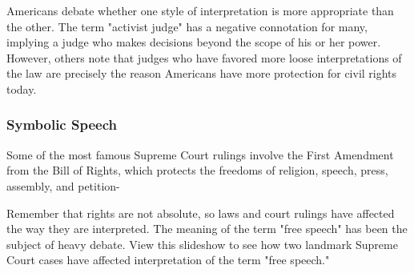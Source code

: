 Americans debate whether one style of interpretation is more appropriate than
the other. The term "activist judge" has a negative connotation for many,
implying a judge who makes decisions beyond the scope of his or her power.
However, others note that judges who have favored more loose interpretations of
the law are precisely the reason Americans have more protection for civil rights
today.

\subsubsection{Symbolic Speech}

Some of the most famous Supreme Court rulings involve the First Amendment from
the Bill of Rights, which protects the freedoms of religion, speech, press,
assembly, and petition-

Remember that rights are not absolute, so laws and court rulings have affected
the way they are interpreted. The meaning of the term "free speech" has been the
subject of heavy debate. View this slideshow to see how two landmark Supreme
Court cases have affected interpretation of the term "free speech."

\newpage

